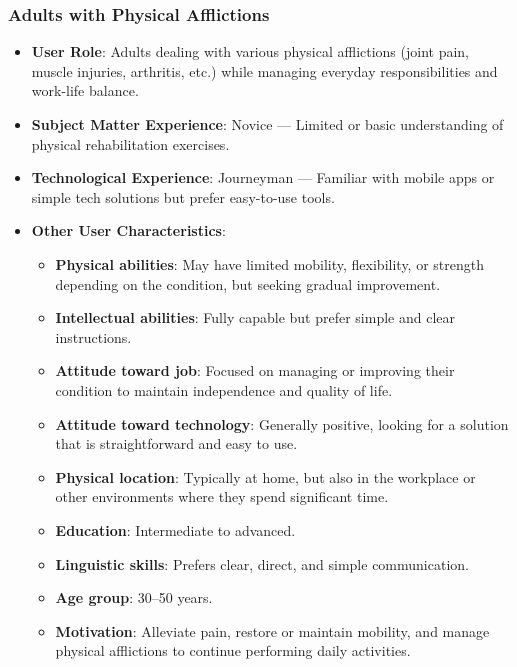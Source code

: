     \subsubsection{Adults with Physical Afflictions}
        \begin{itemize}
            \item \textbf{User Role}: Adults dealing with various physical afflictions (joint pain, muscle injuries, arthritis, etc.) while managing everyday responsibilities and work-life balance.
            \item \textbf{Subject Matter Experience}: Novice --- Limited or basic understanding of physical rehabilitation exercises.
            \item \textbf{Technological Experience}: Journeyman --- Familiar with mobile apps or simple tech solutions but prefer easy-to-use tools.
            \item \textbf{Other User Characteristics}:
            \begin{itemize}
                \item \textbf{Physical abilities}: May have limited mobility, flexibility, or strength depending on the condition, but seeking gradual improvement.
                \item \textbf{Intellectual abilities}: Fully capable but prefer simple and clear instructions.
                \item \textbf{Attitude toward job}: Focused on managing or improving their condition to maintain independence and quality of life.
                \item \textbf{Attitude toward technology}: Generally positive, looking for a solution that is straightforward and easy to use.
                \item \textbf{Physical location}: Typically at home, but also in the workplace or other environments where they spend significant time.
                \item \textbf{Education}: Intermediate to advanced.
                \item \textbf{Linguistic skills}: Prefers clear, direct, and simple communication.
                \item \textbf{Age group}: 30--50 years.
                \item \textbf{Motivation}: Alleviate pain, restore or maintain mobility, and manage physical afflictions to continue performing daily activities.
            \end{itemize}
        \end{itemize}

